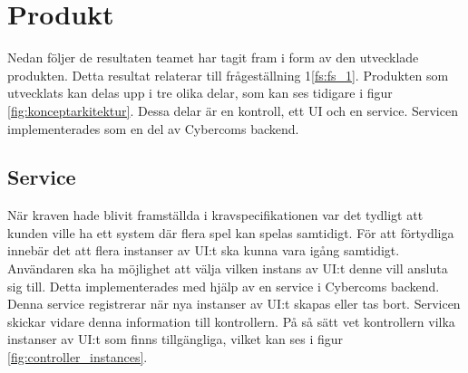 \section{Produkt}
Nedan följer de resultaten teamet har tagit fram i form av den utvecklade produkten. Detta resultat relaterar till frågeställning 1\ref{fs:fs_1}. Produkten som utvecklats kan delas upp i tre olika delar, som kan ses tidigare i figur \ref{fig:konceptarkitektur}. Dessa delar är en kontroll, ett UI och en service. Servicen implementerades som en del av Cybercoms backend.

\subsection{Service}
När kraven hade blivit framställda i kravspecifikationen var det tydligt att kunden ville ha ett system där flera spel kan spelas samtidigt. För att förtydliga innebär det att flera instanser av UI:t ska kunna vara igång samtidigt. Användaren ska ha möjlighet att välja vilken instans av UI:t denne vill ansluta sig till. Detta implementerades med hjälp av en service i Cybercoms backend. Denna service registrerar när nya instanser av UI:t skapas eller tas bort. Servicen skickar vidare denna information till kontrollern. På så sätt vet kontrollern vilka instanser av UI:t som finns tillgängliga, vilket kan ses i figur \ref{fig:controller_instances}.

